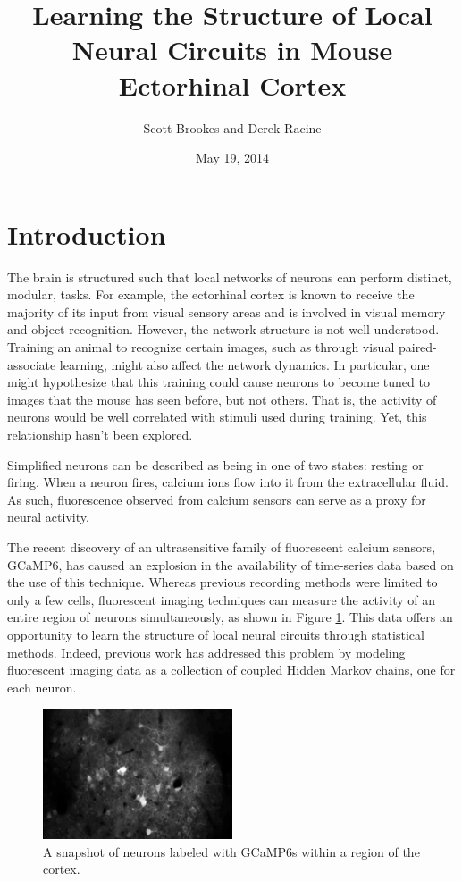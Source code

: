 \documentclass{article}
\title{Learning the Structure of Local Neural Circuits in Mouse Ectorhinal Cortex}
\author{Scott Brookes and Derek Racine}
\date{May 19, 2014}
\begin{document}
\maketitle

\section{Introduction}
The brain is structured such that local networks of neurons can perform 
distinct, modular, tasks. For example, the ectorhinal cortex is known to 
receive the majority of its input from visual sensory areas and is involved 
in visual memory and object recognition. However, the network structure is 
not well understood. Training an animal to recognize certain images, such as 
through visual paired-associate learning, might also affect the network 
dynamics. In particular, one might hypothesize that this training could cause 
neurons to become tuned to images that the mouse has seen before, but not 
others. That is, the activity of neurons would be well correlated with 
stimuli used during training. Yet, this relationship hasn't been 
explored. \par 

Simplified neurons can be described as being in one of two states: resting or 
firing. When a neuron fires, calcium ions flow into it from the extracellular 
fluid. As such, fluorescence observed from calcium sensors can serve as a 
proxy for neural activity. \par

The recent discovery of an ultrasensitive family of fluorescent calcium 
sensors, GCaMP6, has caused an explosion in the availability of time-series 
data based on the use of this technique.\cite{chen13} Whereas previous 
recording methods were limited to only a few cells, fluorescent imaging 
techniques can measure the activity of an entire region of neurons 
simultaneously, as shown in Figure \ref{neurons}. This data offers 
an opportunity to learn the structure of local neural circuits through 
statistical methods. Indeed, previous work has addressed this problem by 
modeling fluorescent imaging data as a collection of coupled Hidden Markov 
chains, one for each neuron.\cite{mishchenko11} \par

\begin{figure}[h]
  \centering
  \includegraphics[width=0.5\textwidth]{neurons}
  \caption{A snapshot of neurons labeled with GCaMP6s within a region of the cortex.}
  \label{neurons}
\end{figure}
\end{document}
